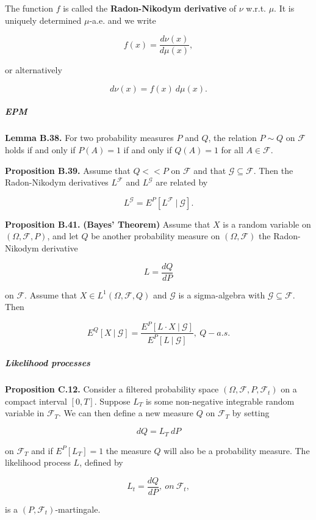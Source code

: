 \documentclass[
]{article}
\begin{document}
The function \(f\) is called the \textbf{Radon-Nikodym derivative} of
\(\nu\) w.r.t. \(\mu\). It is uniquely determined \(\mu\)-a.e. and we
write

\[
f(x)=\frac{d\nu(x)}{d\mu(x)},
\]

or alternatively

\[
d\nu(x)=f(x)\ d\mu(x).
\]

\hypertarget{epm}{%
\subparagraph{EPM}\label{epm}}

\textbf{Lemma B.38.} For two probability measures \(P\) and \(Q\), the
relation \(P\sim Q\) on \(\mathcal{F}\) holds if and only if \(P(A)=1\)
if and only if \(Q(A)=1\) for all \(A\in\mathcal{F}\).

\textbf{Proposition B.39.} Assume that \(Q << P\) on \(\mathcal{F}\) and
that \(\mathcal{G}\subseteq \mathcal{F}\). Then the Radon-Nikodym
derivatives \(L^\mathcal{F}\) and \(L^\mathcal{G}\) are related by

\[
L^\mathcal{G}=E^P[L^\mathcal{F}\ \vert\ \mathcal{G}].
\]

\textbf{Proposition B.41.} \textbf{(Bayes' Theorem)} Assume that \(X\)
is a random variable on \((\Omega, \mathcal{F},P)\), and let \(Q\) be
another probability measure on \((\Omega,\mathcal{F})\) the
Radon-Nikodym derivative

\[
L=\frac{d Q}{dP}
\]

on \(\mathcal{F}\). Assume that \(X\in L^1(\Omega,\mathcal{F},Q)\) and
\(\mathcal{G}\) is a sigma-algebra with
\(\mathcal{G}\subseteq \mathcal{F}\). Then

\[
E^Q[X\ \vert\ \mathcal{G}]=\frac{E^P[L\cdot X\ \vert\ \mathcal{G}]}{E^P[L\ \vert\ \mathcal{G}]},\ Q-a.s.
\]

\hypertarget{likelihood-processes}{%
\subparagraph{Likelihood processes}\label{likelihood-processes}}

\textbf{Proposition C.12.} Consider a filtered probability space
\((\Omega, \mathcal{F},P,\mathcal{F}_t)\) on a compact interval
\([0,T]\). Suppose \(L_T\) is some non-negative integrable random
variable in \(\mathcal{F}_T\). We can then define a new measure \(Q\) on
\(\mathcal{F}_T\) by setting

\[
dQ=L_T\ dP
\]

on \(\mathcal{F}_T\) and if \(E^P[L_T]=1\) the measure \(Q\) will also
be a probability measure. The likelihood process \(L\), defined by

\[
L_t=\frac{dQ}{dP},\ on\ \mathcal{F}_t,
\]

is a \((P,\mathcal{F}_t)\)-martingale.
\end{document}
